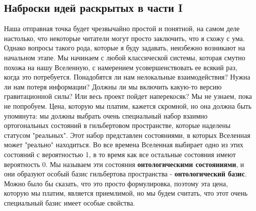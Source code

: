 \documentclass[main.tex]{subfiles}
\begin{document}
\subsection{Наброски идей раскрытых в части I}\label{ch1.2}

Наша отправная точка будет чрезвычайно простой и понятной, на самом деле настолько, что некоторые читатели могут просто заключить, что я схожу с ума. Однако вопросы такого рода, которые я буду задавать, неизбежно возникают на начальном этапе. Мы начинаем с любой классической системы, которая смутно похожа на нашу Вселенную, с намерением усовершенствовать ее всякий раз, когда это потребуется. Понадобятся ли нам нелокальные взаимодействия? Нужна ли нам потеря информации? Должны ли мы включить какую-то версию гравитационной силы? Или весь проект пойдет наперекосяк? Мы не узнаем, пока не попробуем. Цена, которую мы платим, кажется скромной, но она должна быть упомянута: мы должны выбрать очень специальный набор взаимно ортогональных состояний в гильбертовом пространстве, которые наделены статусом "реальных". Этот набор представлен состояниями, в которых Вселенная может "реально" находиться. Во все времена Вселенная выбирает одно из этих состояний с вероятностью 1, в то время как все остальные состояния имеют вероятность 0. Мы называем эти состояния \textbf{онтологическими состояниями}, и они образуют особый базис гильбертова пространства - \textbf{онтологический базис}. Можно было бы сказать, что это просто формулировка, поэтому эта цена, которую мы платим, является приемлимой, но мы будем считать, что этот очень специальный базис имеет особые свойства.
\end{document}
